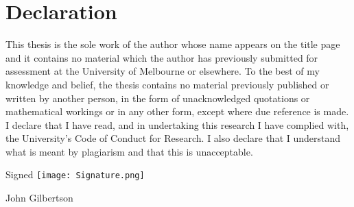 \chapter*{Declaration}

This thesis is the sole work of the author whose name appears on the title page and it contains no material which the author has previously submitted for assessment at the University of Melbourne or elsewhere. To the best of my knowledge and belief, the thesis contains no material previously published or written by another person, in the form of unacknowledged quotations or mathematical workings or in any other form, except where due reference is made. I declare that I have read, and in undertaking this research I have complied with, the University's Code of Conduct for Research. I also declare that I understand what is meant by plagiarism and that this is unacceptable.

\vspace{1cm}

\hspace*{\fill}
Signed
\hspace{1cm}
\texttt{[image: Signature.png]}
\hspace{0.25cm}

\vspace{0.1cm}

\hspace*{\fill}
John Gilbertson

\newpage